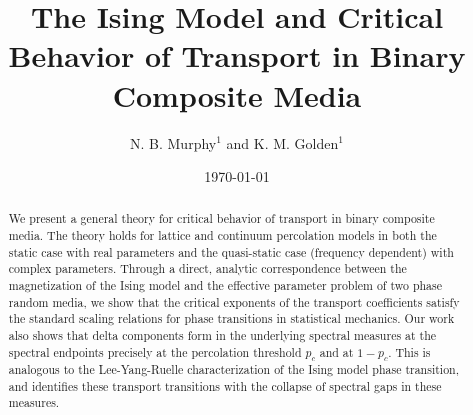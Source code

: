 \documentclass[english,12pt,jmp,graphicx]{revtex4-1}
\begin{document}

\title{The Ising Model
and Critical Behavior of Transport in Binary Composite Media} %



\author{N. B. Murphy$^1$ and K. M. Golden$^1$}
%


\date{\today}

\begin{abstract}
%
We present a general theory for critical behavior of transport in
binary composite media. The theory holds for lattice and continuum
percolation models in both the static case with real parameters and
the quasi-static case (frequency dependent) with complex
parameters. Through a direct, analytic correspondence between the
magnetization of the Ising model and the effective parameter problem
of two phase random media, we show that the critical exponents of the
transport coefficients satisfy the standard scaling relations for
phase transitions in statistical mechanics. Our work also shows that
delta components form in the underlying spectral measures at the
spectral endpoints precisely at the percolation threshold $p_c$ and at
$1-p_c$. This is analogous to the Lee-Yang-Ruelle characterization of
the Ising model phase transition, and identifies these transport
transitions with the collapse of spectral gaps in these measures. 
%
\end{abstract}
\end{document}
